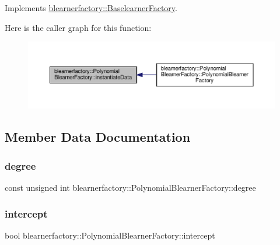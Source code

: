 Implements \hyperlink{classblearnerfactory_1_1_baselearner_factory_ac4a38c4815fb33b8d4785745117c5e57}{blearnerfactory\+::\+Baselearner\+Factory}.

Here is the caller graph for this function\+:\nopagebreak
\begin{figure}[H]
\begin{center}
\leavevmode
\includegraphics[width=350pt]{classblearnerfactory_1_1_polynomial_blearner_factory_aeea9c480671ae7cf7d3be470ce0feaef_icgraph}
\end{center}
\end{figure}


\subsection{Member Data Documentation}
\mbox{\label{classblearnerfactory_1_1_polynomial_blearner_factory_a78c1852e3f1e1b43e6d8bef40032e19f}} 
\subsubsection{\texorpdfstring{degree}{degree}}
{\footnotesize\ttfamily const unsigned int blearnerfactory\+::\+Polynomial\+Blearner\+Factory\+::degree\hspace{0.3cm}{\ttfamily [private]}}

\mbox{\label{classblearnerfactory_1_1_polynomial_blearner_factory_a3a358bd08863c8f01fe20c8d55393df7}} 
\subsubsection{\texorpdfstring{intercept}{intercept}}
{\footnotesize\ttfamily bool blearnerfactory\+::\+Polynomial\+Blearner\+Factory\+::intercept\hspace{0.3cm}{\ttfamily [private]}}



